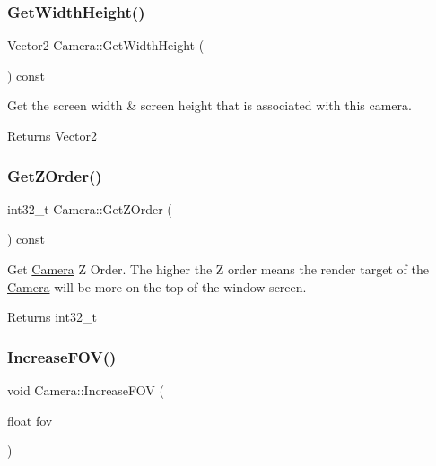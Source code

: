 \subsubsection{\texorpdfstring{Get\+Width\+Height()}{GetWidthHeight()}}
{\footnotesize\ttfamily Vector2 Camera\+::\+Get\+Width\+Height (\begin{DoxyParamCaption}{ }\end{DoxyParamCaption}) const}



Get the screen width \& screen height that is associated with this camera. 

\begin{DoxyReturn}{Returns}
Vector2 
\end{DoxyReturn}
\mbox{\label{classCamera_a6c981b26fc23315fcc7e6776d7dee4ae}} 
\subsubsection{\texorpdfstring{Get\+Z\+Order()}{GetZOrder()}}
{\footnotesize\ttfamily int32\+\_\+t Camera\+::\+Get\+Z\+Order (\begin{DoxyParamCaption}{ }\end{DoxyParamCaption}) const}



Get \hyperlink{classCamera}{Camera} Z Order. The higher the Z order means the render target of the \hyperlink{classCamera}{Camera} will be more on the top of the window screen. 

\begin{DoxyReturn}{Returns}
int32\+\_\+t 
\end{DoxyReturn}
\mbox{\label{classCamera_a57e39ce60794095afebda3d38b681fe9}} 
\subsubsection{\texorpdfstring{Increase\+F\+O\+V()}{IncreaseFOV()}}
{\footnotesize\ttfamily void Camera\+::\+Increase\+F\+OV (\begin{DoxyParamCaption}\item[{float}]{fov }\end{DoxyParamCaption})}



